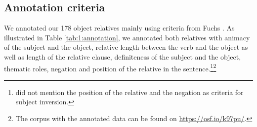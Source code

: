 \documentclass[output=paper]{langscibook}
\begin{document}
\subsection{Annotation criteria}
We annotated our 178 object relatives mainly using criteria from Fuchs
\citep{catherine1997, Fuchs2006}. As illustrated in Table
\ref{tab:1:annotation}, we annotated both relatives with animacy of
the subject and the object, relative length between the verb and the
object as well as length of the relative clause, definiteness of the
subject and the object, thematic roles, negation and position of the
relative in the sentence.\footnote{\citet{Fuchs2006} did not mention
  the position of the relative and the negation as criteria for
  subject inversion.}\footnote{The corpus with the annotated
  data can be found on \url{https://osf.io/k97pu/}.}
\end{document}
